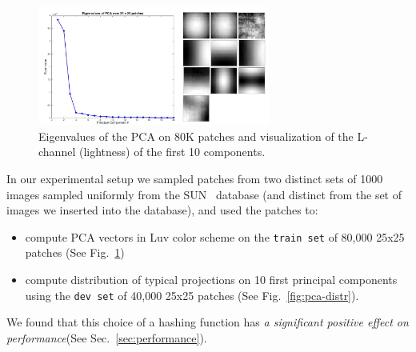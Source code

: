 \begin{figure}[ht!]
\includegraphics[width=3.0in]{fig_NN/principal_comps.png}
\caption{Eigenvalues of the PCA on 80K patches and visualization
of the L-channel (lightness) of the first 10 components.}
\label{fig:lambdas}
\end{figure}

In our experimental setup we sampled patches from two distinct
sets of 1000 images sampled uniformly from the SUN~\cite{SUN} database
(and distinct from the set of images we inserted into the database),
and used the patches to:
\begin{itemize}
\item compute PCA vectors in Luv color scheme on the \texttt{train{\allowbreak} set}
of 80,000 25x25 patches (See Fig.~\ref{fig:lambdas})
\item compute distribution of typical projections on 10
first principal components using the \texttt{dev{\allowbreak} set} of
40,000 25x25 patches (See Fig.~\ref{fig:pca-distr}).
\end{itemize}
We found that this choice of a hashing function has \emph{a
significant positive effect on performance}(See Sec.~\ref{sec:performance}).

